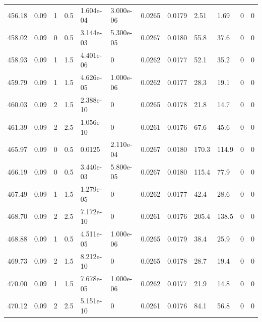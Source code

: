\documentclass[preview]{standalone}
\begin{document}
{{{{{{{{\begin{tabular}{L{1.2cm}C{1.2cm} C{0.3cm}C{0.5cm} C{1.4cm}C{1.4cm} C{1.4cm}C{1.4cm} C{1.6cm}C{1.6cm} C{1.6cm}C{1.6cm}}
  456.18  &  0.09  & 1     & 0.5 &  1.604e-04  & 3.000e-06  &  0.0265&   0.0179& 2.51 & 1.69   &  0 & 0  \\ 
  458.02  &  0.09  & 0     & 0.5 &  3.144e-03  & 5.300e-05  &  0.0267&   0.0180& 55.8 & 37.6   &  0 & 0  \\ 
  458.93  &  0.09  & 1     & 1.5 &  4.401e-06  & 0  &  0.0262&   0.0177& 52.1 & 35.2   &  0 & 0  \\ 
  459.79  &  0.09  & 1     & 1.5 &  4.626e-05  & 1.000e-06  &  0.0262&   0.0177& 28.3 & 19.1   &  0 & 0  \\ 
  460.03  &  0.09  & 2     & 1.5 &  2.388e-10  & 0  &  0.0265&   0.0178& 21.8 & 14.7   &  0 & 0  \\ 
  461.39  &  0.09  & 2     & 2.5 &  1.056e-10  & 0  &  0.0261&   0.0176& 67.6 & 45.6   &  0 & 0  \\ 
  465.97  &  0.09  & 0     & 0.5 &  0.0125  & 2.110e-04  &  0.0267&   0.0180& 170.3 & 114.9   &  0 & 0  \\ 
  466.19  &  0.09  & 0     & 0.5 &  3.440e-03  & 5.800e-05  &  0.0267&   0.0180& 115.4 & 77.9   &  0 & 0  \\ 
  467.49  &  0.09  & 1     & 1.5 &  1.279e-05  & 0  &  0.0262&   0.0177& 42.4 & 28.6   &  0 & 0  \\ 
  468.70  &  0.09  & 2     & 2.5 &  7.172e-10  & 0  &  0.0261&   0.0176& 205.4 & 138.5   &  0 & 0  \\ 
  468.88  &  0.09  & 1     & 0.5 &  4.511e-05  & 1.000e-06  &  0.0265&   0.0179& 38.4 & 25.9   &  0 & 0  \\ 
  469.73  &  0.09  & 2     & 1.5 &  8.212e-10  & 0  &  0.0265&   0.0178& 28.7 & 19.4   &  0 & 0  \\ 
  470.00  &  0.09  & 1     & 1.5 &  7.678e-05  & 1.000e-06  &  0.0262&   0.0177& 21.9 & 14.8   &  0 & 0  \\ 
  470.12  &  0.09  & 2     & 2.5 &  5.151e-10  & 0  &  0.0261&   0.0176& 84.1 & 56.8   &  0 & 0  \\ 
\hline 
\end{tabular} 

}}}}}}}}
\end{document}
